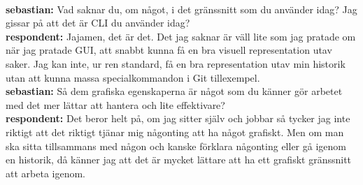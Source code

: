 \documentclass[a4paper,oneside]{bth} %
\begin{document}
		\\\textbf{sebastian:} Vad saknar du, om något, i det gränssnitt som du använder idag? Jag gissar på att det är CLI du använder idag?
		\\\textbf{respondent:} Jajamen, det är det. Det jag saknar är väll lite som jag pratade om när jag pratade GUI, att snabbt kunna få en bra visuell representation utav saker. Jag kan inte, ur ren standard, få en bra representation utav min historik utan att kunna massa specialkommandon i Git tillexempel.
		\\\textbf{sebastian:} Så dem grafiska egenskaperna är något som du känner gör arbetet med det mer lättar att hantera och lite effektivare?
		\\\textbf{respondent:} Det beror helt på, om jag sitter själv och jobbar så tycker jag inte riktigt att det riktigt tjänar mig någonting att ha något grafiskt.
		Men om man ska sitta tillsammans med någon och kanske förklara någonting eller gå igenom en historik, då känner jag att det är mycket lättare att ha ett grafiskt gränssnitt att arbeta igenom.
		
		
		
\end{document}
